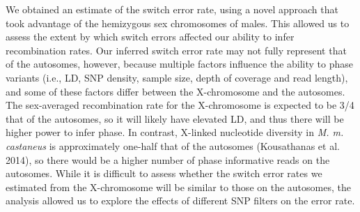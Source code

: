         	We obtained an estimate of the switch error rate, using a novel approach that took advantage of the hemizygous sex chromosomes of males. This allowed us to assess the extent by which switch errors affected our ability to infer recombination rates. Our inferred switch error rate may not fully represent that of the autosomes, however, because multiple factors influence the ability to phase variants (i.e., LD, SNP density, sample size, depth of coverage and read length), and some of these factors differ between the X-chromosome and the autosomes. The sex-averaged recombination rate for the X-chromosome is expected to be 3/4 that of the autosomes, so it will likely have elevated LD, and thus there will be higher power to infer phase. In contrast, X-linked nucleotide diversity in \textit{M. m. castaneus} is approximately one-half that of the autosomes (Kousathanas et al. 2014), so there would be a higher number of phase informative reads on the autosomes. While it is difficult to assess whether the switch error rates we estimated from the X-chromosome will be similar to those on the autosomes, the analysis allowed us to explore the effects of different SNP filters on the error rate.
 
